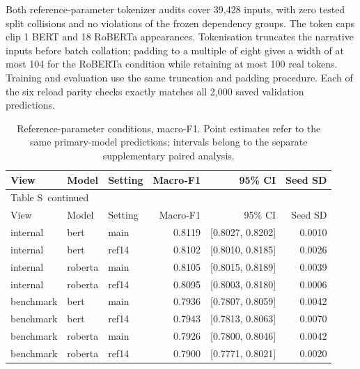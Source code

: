 \documentclass[10pt,a4paper]{article}
\renewcommand{\thetable}{S\arabic{table}}
\begin{document}
Both reference-parameter tokenizer audits cover 39,428 inputs, with zero tested split collisions and no violations of the frozen dependency groups. The token caps clip 1 BERT and 18 RoBERTa appearances. Tokenisation truncates the narrative inputs before batch collation; padding to a multiple of eight gives a width of at most 104 for the RoBERTa condition while retaining at most 100 real tokens. Training and evaluation use the same truncation and padding procedure. Each of the six reload parity checks exactly matches all 2,000 saved validation predictions.


{\small
\setlength{\tabcolsep}{4pt}
\begin{longtable}{@{}lllrrr@{}}
\caption{Reference-parameter conditions, macro-F1. Point estimates refer to the same primary-model predictions; intervals belong to the separate supplementary paired analysis.}\label{sup:ref14-means}\\
\toprule
View & Model & Setting & Macro-F1 & 95\% CI & Seed SD \\
\midrule\endfirsthead
\multicolumn{6}{l}{\small Table \thetable\ continued}\\
\toprule
View & Model & Setting & Macro-F1 & 95\% CI & Seed SD \\
\midrule\endhead
\bottomrule\endfoot
internal & bert & main & 0.8119 & [0.8027, 0.8202] & 0.0010 \\
internal & bert & ref14 & 0.8102 & [0.8010, 0.8185] & 0.0026 \\
internal & roberta & main & 0.8105 & [0.8015, 0.8189] & 0.0039 \\
internal & roberta & ref14 & 0.8095 & [0.8003, 0.8180] & 0.0006 \\
benchmark & bert & main & 0.7936 & [0.7807, 0.8059] & 0.0042 \\
benchmark & bert & ref14 & 0.7943 & [0.7813, 0.8063] & 0.0070 \\
benchmark & roberta & main & 0.7926 & [0.7800, 0.8046] & 0.0042 \\
benchmark & roberta & ref14 & 0.7900 & [0.7771, 0.8021] & 0.0020 \\
\end{longtable}
}
\end{document}
